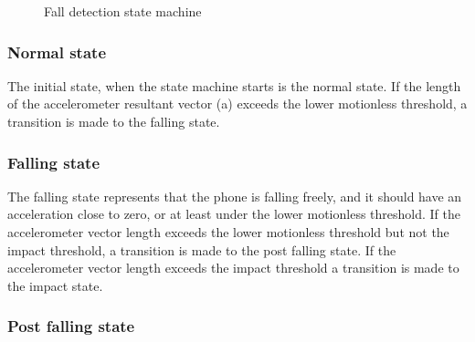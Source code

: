 \documentclass[12pt, a4paper, onecolumn]{article}
\begin{document}
	\begin{figure}[H]
		\centering
		\caption{Fall detection state machine}%
		\label{fig:state-machine}%
	\end{figure}
	
	\subsubsection{Normal state}
	
	The initial state, when the state machine starts is the normal state. If the length of the accelerometer resultant vector (a) exceeds the lower motionless threshold, a transition is made to the falling state.
	
	\subsubsection{Falling state}
	
	The falling state represents that the phone is falling freely, and it should have an acceleration close to zero, or at least under the lower motionless threshold. If the accelerometer vector length exceeds the lower motionless threshold but not the impact threshold, a transition is made to the post falling state. If the accelerometer vector length exceeds the impact threshold a transition is made to the impact state.
	
	\subsubsection{Post falling state}
	
\end{document}
